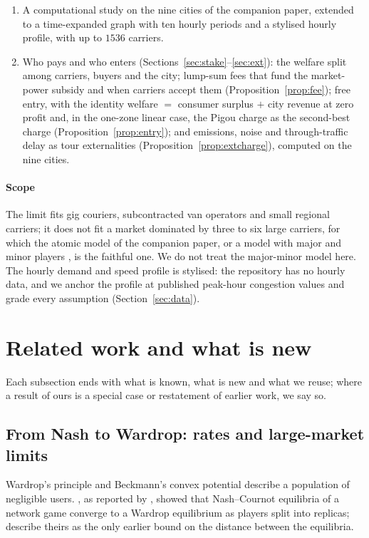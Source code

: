 \documentclass[preprint,11pt,authoryear]{elsarticle}
\theoremstyle{plain}
\theoremstyle{remark}
\begin{document}
\begin{enumerate}
\item A computational study on the nine cities of the companion paper, extended to a time-expanded graph with ten hourly periods and a stylised hourly profile, with up to $1536$ carriers.
\item Who pays and who enters (Sections~\ref{sec:stake}--\ref{sec:ext}): the welfare split among carriers, buyers and the city; lump-sum fees that fund the market-power subsidy and when carriers accept them (Proposition~\ref{prop:fee}); free entry, with the identity welfare $=$ consumer surplus $+$ city revenue at zero profit and, in the one-zone linear case, the Pigou charge as the second-best charge (Proposition~\ref{prop:entry}); and emissions, noise and through-traffic delay as tour externalities (Proposition~\ref{prop:extcharge}), computed on the nine cities.
\end{enumerate}

\paragraph{Scope} The limit fits gig couriers, subcontracted van operators and small regional carriers; it does not fit a market dominated by three to six large carriers, for which the atomic model of the companion paper, or a model with major and minor players \citep{Huang2010}, is the faithful one. We do not treat the major-minor model here. The hourly demand and speed profile is stylised: the repository has no hourly data, and we anchor the profile at published peak-hour congestion values and grade every assumption (Section~\ref{sec:data}).

\section{Related work and what is new}\label{sec:related}

Each subsection ends with what is known, what is new and what we reuse; where a result of ours is a special case or restatement of earlier work, we say so.

\subsection{From Nash to Wardrop: rates and large-market limits}\label{sec:rw-nw}

Wardrop's principle \citep{Wardrop1952} and Beckmann's convex potential \citep{Beckmann1956} describe a population of negligible users. \citet{HaurieMarcotte1985}, as reported by \citet{Paccagnan2019}, showed that Nash--Cournot equilibria of a network game converge to a Wardrop equilibrium as players split into replicas; \citeauthor{Paccagnan2019} describe theirs as the only earlier bound on the distance between the equilibria.
\end{document}
